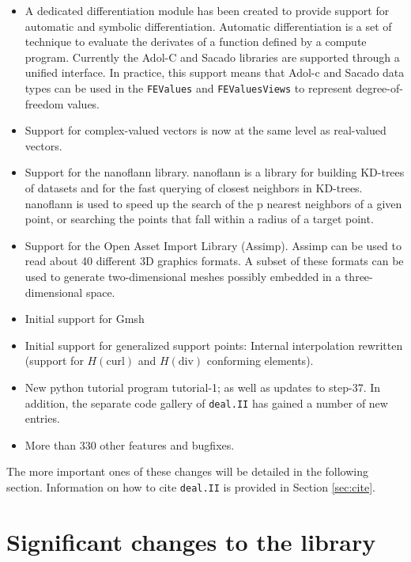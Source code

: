 \documentclass{ansarticle-preprint}
\newcommand{\specialword}[1]{\texttt{#1}}
\newcommand{\dealii}{{\specialword{deal.II}}}
\begin{document}
\begin{itemize}
\item
  A dedicated differentiation module has been created to provide support for
  automatic and symbolic differentiation. Automatic differentiation is a set of
  technique to evaluate the derivates of a function defined by a compute
  program. Currently the Adol-C and Sacado libraries are supported through a
  unified interface. In practice, this support means that Adol-c and Sacado
  data types can be used in the \texttt{FEValues} and \texttt{FEValuesViews}
  to represent degree-of-freedom values.

\item
  Support for complex-valued vectors is now at the same level as real-valued
  vectors.

\item
  Support for the nanoflann library. nanoflann is a library for building
  KD-trees of datasets and for the fast querying of closest neighbors in
  KD-trees. nanoflann is used to speed up the search of the p nearest neighbors
  of a given point, or searching the points that fall within a radius of a
  target point.

\item
  Support for the Open Asset Import Library (Assimp). Assimp can be used to read
  about 40 different 3D graphics formats. A subset of these formats can be used
  to generate two-dimensional meshes possibly embedded in a three-dimensional
  space.

\item
  Initial support for Gmsh

\item
  Initial support for generalized support points: Internal interpolation
  rewritten (support for $H(\text{curl})$ and $H(\text{div})$ conforming
  elements).

\item New python tutorial program tutorial-1; as well as
  updates to step-37. In addition, the separate code
  gallery of \dealii{} has gained a number of new entries.

  \item More than 330 other features and bugfixes.
\end{itemize}
The more important ones of these changes will be detailed in the
following section.  Information on how to cite \dealii{} is provided
in Section \ref{sec:cite}.



\section{Significant changes to the library}
\end{document}
